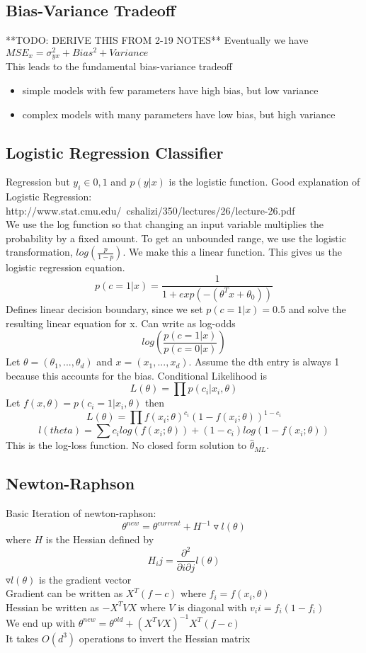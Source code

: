 \documentclass[11pt,psfig]{article}
\begin{document}
\subsection*{Bias-Variance Tradeoff}

**TODO: DERIVE THIS FROM 2-19 NOTES**
Eventually we have $MSE_x = \sigma_{yx}^2 + Bias^2 + Variance$\\
This leads to the fundamental bias-variance tradeoff
\begin{itemize}
\item simple models with few parameters have high bias, but low variance
\item complex models with many parameters have low bias, but high variance
\end{itemize}

\subsection*{Logistic Regression Classifier}

Regression but $y_i \in {0,1}$ and $p(y|x)$ is the logistic function. Good explanation of Logistic Regression:\\
http://www.stat.cmu.edu/~cshalizi/350/lectures/26/lecture-26.pdf
\\
We use the log function so that changing an input variable multiplies the probability by a fixed amount. To get an unbounded range, we use the logistic transformation, $log(\frac{p}{1-p})$. We make this a linear function. This gives us the logistic regression equation. \\
\[
p(c=1|x) = \frac{1}{1 + exp(-(\theta^Tx + \theta_0))}
\]
Defines linear decision boundary, since we set $p(c=1|x)=0.5$ and solve the resulting linear equation for x. Can write as log-odds
\[
log(\frac{p(c=1|x)}{p(c=0|x)})
\]
Let $\theta = (\theta_1,...,\theta_d)$ and $x=(x_1,...,x_d)$. Assume the dth entry is always 1 because this accounts for the bias. Conditional Likelihood is
\[
L(\theta) = \prod{p(c_i|x_i,\theta)}
\]
Let $f(x,\theta) = p(c_i=1|x_i,\theta)$ then
\[
L(\theta) = \prod{f(x_i;\theta)^{c_i}(1 - f(x_i;\theta))^{1-c_i}}
\]
\[
l(theta) = \sum{c_i log(f(x_i;\theta)) + (1-c_i)log(1-f(x_i;\theta))}
\]
This is the log-loss function. No closed form solution to $\hat{\theta}_{ML}$. 

\subsection*{Newton-Raphson}
Basic Iteration of newton-raphson:
\[
\theta^{new} = \theta^{current} + H^{-1} \triangledown l(\theta)
\]
where $H$ is the Hessian defined by
\[
H_ij = \frac{\partial^2}{\partial i \partial j} l(\theta)
\]
$\triangledown l(\theta)$ is the gradient vector\\
Gradient can be written as $X^T (f-c)$ where $f_i = f(x_i,\theta)$\\
Hessian be written as $-X^T V X$ where $V$ is diagonal with $v_ii = f_i(1-f_i)$\\
We end up with $\theta^{new} = \theta^{old} + (X^T V X)^{-1} X^T (f-c)$\\
It takes $O(d^3)$ operations to invert the Hessian matrix
\end{document}
